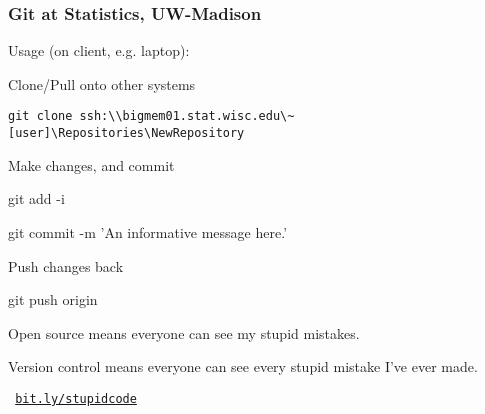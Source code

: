 \documentclass[aspectratio=169,12pt,t]{beamer}
\begin{document}
\begin{frame}
\frametitle{Git at Statistics, UW-Madison}

\vspace{18pt}

Usage (on client, e.g. laptop):
\bigskip

\bi
\item Clone/Pull onto other systems
    \bi
    \item[] {\tt \tiny git clone ssh:{\textbackslash\textbackslash}bigmem01.stat.wisc.edu{\textbackslash\textasciitilde}[user]{\textbackslash}Repositories{\textbackslash}NewRepository}
    \ei
\item Make changes, and commit
    \bi
    \item[] {\ttfn git add -i}
    \item[] {\ttfn git commit -m 'An informative message here.'}
    \ei
\item Push changes back
    \bi
    \item[] {\ttfn git push origin}
    \ei
\ei

\end{frame}






\begin{frame}{}

\vspace{25mm}

Open source means everyone can see my stupid mistakes.

\vspace{5mm}

Version control means everyone can see every stupid mistake I've ever
made.

\vspace{33mm}
\centerline{\scriptsize \tt \color{lolit} \href{http://bit.ly/stupidcode}{bit.ly/stupidcode}}

\end{frame}
\end{document}
